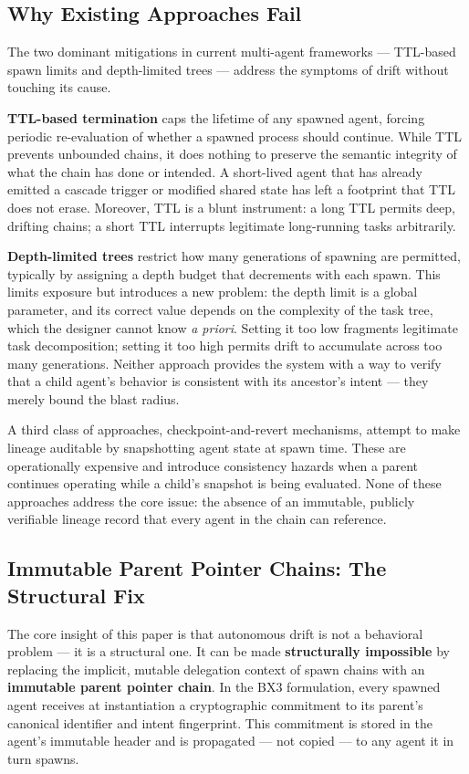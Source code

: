 \subsection{Why Existing Approaches Fail}

The two dominant mitigations in current multi-agent frameworks — TTL-based spawn limits and depth-limited trees — address the symptoms of drift without touching its cause.

\textbf{TTL-based termination} caps the lifetime of any spawned agent, forcing periodic re-evaluation of whether a spawned process should continue. While TTL prevents unbounded chains, it does nothing to preserve the semantic integrity of what the chain has done or intended. A short-lived agent that has already emitted a cascade trigger or modified shared state has left a footprint that TTL does not erase. Moreover, TTL is a blunt instrument: a long TTL permits deep, drifting chains; a short TTL interrupts legitimate long-running tasks arbitrarily.

\textbf{Depth-limited trees} restrict how many generations of spawning are permitted, typically by assigning a depth budget that decrements with each spawn. This limits exposure but introduces a new problem: the depth limit is a global parameter, and its correct value depends on the complexity of the task tree, which the designer cannot know \textit{a priori}. Setting it too low fragments legitimate task decomposition; setting it too high permits drift to accumulate across too many generations. Neither approach provides the system with a way to verify that a child agent's behavior is consistent with its ancestor's intent — they merely bound the blast radius.

A third class of approaches, checkpoint-and-revert mechanisms, attempt to make lineage auditable by snapshotting agent state at spawn time. These are operationally expensive and introduce consistency hazards when a parent continues operating while a child's snapshot is being evaluated. None of these approaches address the core issue: the absence of an immutable, publicly verifiable lineage record that every agent in the chain can reference.

\subsection{Immutable Parent Pointer Chains: The Structural Fix}

The core insight of this paper is that autonomous drift is not a behavioral problem — it is a structural one. It can be made \textbf{structurally impossible} by replacing the implicit, mutable delegation context of spawn chains with an \textbf{immutable parent pointer chain}. In the BX3 formulation, every spawned agent receives at instantiation a cryptographic commitment to its parent's canonical identifier and intent fingerprint. This commitment is stored in the agent's immutable header and is propagated — not copied — to any agent it in turn spawns.

